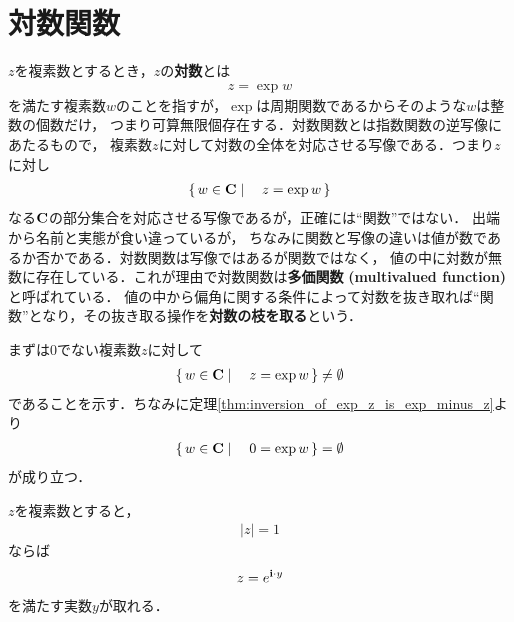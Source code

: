 \section{対数関数}
	
	$z$を複素数とするとき，$z$の{\bf 対数}とは
	\begin{align}
		z = \exp{w}
	\end{align}
	を満たす複素数$w$のことを指すが，$\exp$は周期関数であるからそのような$w$は整数の個数だけ，
	つまり可算無限個存在する．対数関数とは指数関数の逆写像にあたるもので，
	複素数$z$に対して対数の全体を対応させる写像である．つまり$z$に対し
	\begin{align}
		\left\{\, w \in \mathbf{C} \mid \quad z = \exp{w}\, \right\}
	\end{align}
	なる$\mathbf{C}$の部分集合を対応させる写像であるが，正確には``関数''ではない．
	出端から名前と実態が食い違っているが，
	ちなみに関数と写像の違いは値が数であるか否かである．対数関数は写像ではあるが関数ではなく，
	値の中に対数が無数に存在している．これが理由で対数関数は{\bf 多価関数}
	{\bf (multivalued function)}と呼ばれている．
	値の中から偏角に関する条件によって対数を抜き取れば``関数''となり，その抜き取る操作を{\bf 対数の枝を取る}という．
	
	まずは$0$でない複素数$z$に対して
	\begin{align}
		\left\{\, w \in \mathbf{C} \mid \quad z = \exp{w}\, \right\} \neq \emptyset
	\end{align}
	であることを示す．ちなみに定理\ref{thm:inversion_of_exp_z_is_exp_minus_z}より
	\begin{align}
		\left\{\, w \in \mathbf{C} \mid \quad 0 = \exp{w}\, \right\} = \emptyset
	\end{align}
	が成り立つ．
	
	\begin{screen}
		\begin{thm}
		\label{thm:complex_number_with_absolute_value_1_is_exp_pure_imaginary}
			$z$を複素数とすると，
			\begin{align}
				|z| = 1
			\end{align}
			ならば
			\begin{align}
				z = e^{\mathbf{i} \cdot y}
			\end{align}
			を満たす実数$y$が取れる．
		\end{thm}
	\end{screen}
	
